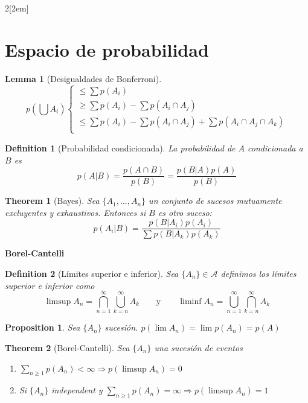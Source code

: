 \documentclass[leqno]{article}
\newtheorem*{theorem}{Theorem}
\newtheorem*{lemma}{Lemma}
\newtheorem*{proposition}{Proposition}
\newtheorem*{definition}{Definition}
\begin{document}
\newpage
\begin{multicols}{2}[\columnsep2em]
\section{Espacio de probabilidad}
\begin{lemma}[Desigualdades de Bonferroni]
  \[
  p \left( \bigcup A_i \right)  \begin{cases}
    \le \sum p(A_i) \\
    \ge \sum p(A_i) - \sum p(A_i\cap A_j)\\
    \le \sum p(A_i) - \sum p(A_i\cap A_j) + \sum p(A_i\cap A_j\cap A_k)\\
  \end{cases}
  \] 
\end{lemma}

\begin{definition}[Probabilidad condicionada] La probabilidad de $A$ condicionada a  $B$ es
   \[
	   p(A|B) = \frac{p(A\cap B)}{p(B)} = \frac{p(B|A)p(A)}{p(B)}
  \] 
\end{definition}
\begin{theorem}[Bayes] Sea $\{A_1, \ldots, A_n\}$ un conjunto de sucesos mutuamente excluyentes y exhaustivos. Entonces si $B$ es otro suceso:
\[
 p(A_i|B) = \frac{p(B|A_i)p(A_i)}{\sum p(B|A_k)p(A_k)}
\] 
\end{theorem}

\textbf{Borel-Cantelli}

\begin{definition}[Límites superior e inferior] Sea $\{A_n\}\in \mathcal{A}$ definimos los límites superior e inferior como
  \[
  \limsup A_n =  \bigcap_{n=1}^\infty \bigcup_{k=n}^\infty A_k \qquad \text{y} \qquad 
  \liminf A_n =  \bigcup_{n=1}^\infty \bigcap_{k=n}^\infty A_k
  \] 
\end{definition}

\begin{proposition}
Sea $\{A_n\}$ sucesión.  $p(\lim A_n) = \lim p(A_n) = p(A)$ 
\end{proposition}
\begin{theorem}[Borel-Cantelli] Sea $\{A_n\}$ una sucesión de eventos
\begin{enumerate}[topsep=-6pt, itemsep=0pt]
  \item $\sum_{n\ge 1} p(A_n) < \infty \Rightarrow p(\limsup A_n) = 0 $ 
  \item Si $\{A_n\}$ independent y $\sum_{n\ge 1}p(A_n)=\infty \Rightarrow p(\limsup A_n)=1$
\end{enumerate}
\end{theorem}


\end{multicols}
\end{document}
